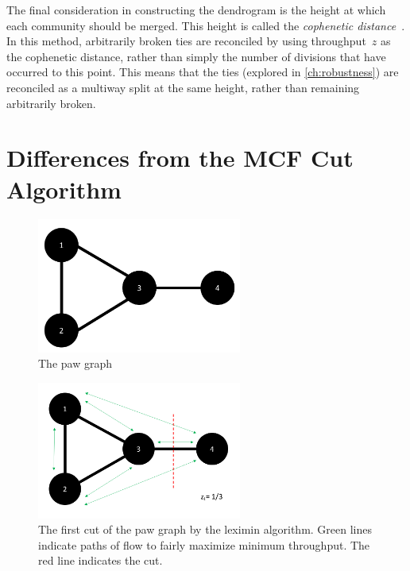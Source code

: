 The final consideration in constructing the dendrogram is the height at which each community should be merged. This height is called the \emph{cophenetic distance}~\cite{sokal1962comparison}. In this method, arbitrarily broken ties are reconciled by using throughput~$z$ as the cophenetic distance, rather than simply the number of divisions that have occurred to this point. This means that the ties (explored in \autoref{ch:robustness}) are reconciled as a multiway split at the same height, rather than remaining arbitrarily broken. 





\section{Differences from the MCF Cut Algorithm} \label{sec:differences}

\begin{figure}
\centering
\includegraphics[width=0.6\textwidth]{fig/Paw3}
\caption{The paw graph}
\label{fig:paw3}
\end{figure}

\begin{figure}
\centering
\includegraphics[width=0.6\textwidth]{fig/level1}
\caption{The first cut of the paw graph by the leximin algorithm. Green lines indicate paths of flow to fairly maximize minimum throughput. The red line indicates the cut.}
\label{fig:level1}
\end{figure}

